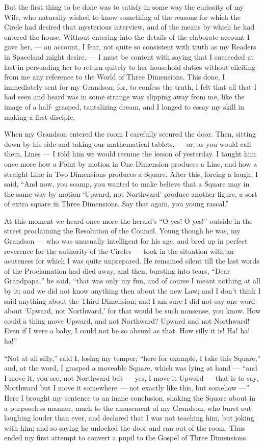 \documentclass[12pt, a4paper, twoside]{memoir}
\begin{document}
But the first thing to be done was to satisfy in some way the curiosity of my
Wife, who naturally wished to know something of the reasons for which the
Circle had desired that mysterious interview, and of the means by which he had
entered the house. Without entering into the details of the elaborate account
I gave her, --- an account, I fear, not quite so consistent with truth as my
Readers in Spaceland might desire, --- I must be content with saying that I
succeeded at last in persuading her to return quitely to her household duties
without eliciting from me any reference to the World of Three Dimensions. This
done, I immediately sent for my Grandson; for, to confess the truth, I felt
that all that I had seen and heard was in some strange way slipping away from
me, like the image of a half- grasped, tantalizing dream, and I longed to
essay my skill in making a first disciple.

When my Grandson entered the room I carefully secured the door. Then, sitting
down by his side and taking our mathematical tablets, --- or, as you would call
them, Lines --- I told him we would resume the lesson of yesterday. I taught him
once more how a Point by motion in One Dimension produces a Line, and how a
straight Line in Two Dimensions produces a Square. After this, forcing a
laugh, I said, ``And now, you scamp, you wanted to make believe that a Square
may in the same way by motion `Upward, not Northward' produce another figure,
a sort of extra square in Three Dimensions. Say that again, you young rascal.''

At this moment we heard once more the herald's ``O yes! O yes!'' outside in the
street proclaiming the Resolution of the Council. Young though he was, my
Grandson --- who was unusually intelligent for his age, and bred up in perfect
reverence for the authority of the Circles --- took in the situation with an
acuteness for which I was quite unprepared. He remained silent till the last
words of the Proclamation had died away, and then, bursting into tears, ``Dear
Grandpapa,'' he said, ``that was only my fun, and of course I meant nothing at
all by it; and we did not know anything then about the new Law; and I don't
think I said anything about the Third Dimension; and I am sure I did not say
one word about `Upward, not Northward,' for that would be such nonsense, you
know. How could a thing move Upward, and not Northward? Upward and not
Northward! Even if I were a baby, I could not be so absurd as that. How silly
it is! Ha! ha! ha!''

``Not at all silly,'' said I, losing my temper; ``here for example, I take this
Square,'' and, at the word, I grasped a moveable Square, which was lying at
hand --- ``and I move it, you see, not Northward but --- yes, I move it Upward ---
that is to say, Northward but I move it somewhere --- not exactly like this, but
somehow ---'' Here I brought my sentence to an inane conclusion, shaking the
Square about in a purposeless manner, much to the amusement of my Grandson,
who burst out laughing louder than ever, and declared that I was not teaching
him, but joking with him; and so saying he unlocked the door and ran out of
the room. Thus ended my first attempt to convert a pupil to the Gospel of
Three Dimensions.
\end{document}
